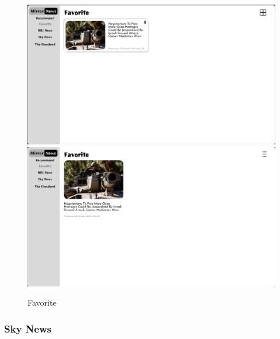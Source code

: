 \documentclass[a4paper]{article}
\begin{document}
\begin{figure}[H] %
	\centering %
	\includegraphics[width=1\textwidth]{./images/Favorite.png} %
	\includegraphics[width=1\textwidth]{./images/Favorite 2.png} %
	\caption*{Favorite} %
	\label{Fig.Favorite} %
\end{figure}

\subsubsection{Sky News}
\end{document}
